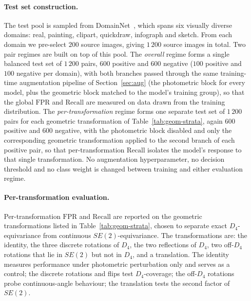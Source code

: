 \documentclass{article}
\begin{document}
\paragraph{Test set construction.} The test pool is sampled from DomainNet~\citep{peng2019domainnet}, which spans six visually diverse domains: real, painting, clipart, quickdraw, infograph and sketch. From each domain we pre-select $200$ source images, giving $1\,200$ source images in total. Two pair regimes are built on top of this pool. The \emph{overall} regime forms a single balanced test set of $1\,200$ pairs, $600$ positive and $600$ negative ($100$ positive and $100$ negative per domain), with both branches passed through the same training-time augmentation pipeline of Section~\ref{sec:aug} (the photometric block for every model, plus the geometric block matched to the model's training group), so that the global $\mathrm{FPR}$ and $\mathrm{Recall}$ are measured on data drawn from the training distribution. The \emph{per-transformation} regime forms one separate test set of $1\,200$ pairs for each geometric transformation of Table~\ref{tab:geom-strata}, again $600$ positive and $600$ negative, with the photometric block disabled and only the corresponding geometric transformation applied to the second branch of each positive pair, so that per-transformation $\mathrm{Recall}$ isolates the model's response to that single transformation. No augmentation hyperparameter, no decision threshold and no class weight is changed between training and either evaluation regime.

\paragraph{Per-transformation evaluation.} Per-transformation $\mathrm{FPR}$ and $\mathrm{Recall}$ are reported on the geometric transformations listed in Table~\ref{tab:geom-strata}, chosen to separate exact $D_4$-equivariance from continuous $SE(2)$-equivariance. The transformations are: the identity, the three discrete rotations of $D_4$, the two reflections of $D_4$, two off-$D_4$ rotations that lie in $SE(2)$ but not in $D_4$, and a translation. The identity measures performance under photometric perturbation only and serves as a control; the discrete rotations and flips test $D_4$-coverage; the off-$D_4$ rotations probe continuous-angle behaviour; the translation tests the second factor of $SE(2)$.
\end{document}
